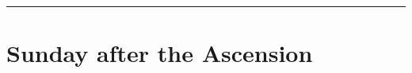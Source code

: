 {{\def\deusinadjutoriumsolemn{T}
\def\postpsalmtitlethree{\needspace{18\baselineskip}}
\def\prepsalmthreeverses{}
\def\preantfive{\needspace{12\baselineskip}}
\def\prevr{\needspace{12\baselineskip}}
\def\premagnificat{\oldneedspace{7\baselineskip}}
\def\premagverses{\greseteolcustos{manual}\oldneedspace{18\baselineskip}}
\def\begincollectcols{%
\begin{parcolumns}[rulebetween,colwidths={1=0.46\linewidth}]{2}}
\def\definevesperspropers{
    \def\prepsalmfive{\greseteolcustos{manual}}
}
\def\definevesperspropersalt{
}
\def\vesperspropersnote{At II Vespers:}
\def\vesperspropersaltnote{At I Vespers:}
\let\printhymnnote=\undefined
\def\hymnlabel{hymn-salutishumanaesator}
\def\prevr{\bigskip{}
\emph{On the Sunday after the Ascension, \emph{\Vbar{}~Dóminus in cælo}, p.~\pageref{vr-sundayafterascension}}.

\bigskip}

\def\commemorations{If today is April 30 or May 1, \emph{First Vespers of St Joseph the Worker} is commemorated as on page \pageref{stjoseph-worker-commem}.}
\printcommemnote[1]{}
\bigskip
\hrule
}

{
\section{Sunday after the Ascension}
\label{easter6}\label{sundayafterascension}
\printcommonvespers{}
\renewcommand{\printhymnnote}{
    \medskip
    \noindent\printnote{Hymn.~\emph{Salútis humánæ Sator}, page \pageref{hymn-salutishumanaesator}.}
    \medskip
    \def\vrlinebreak{T}
    \label{vr-sundayafterascension}
    \printvr[\greseteolcustos{manual}]{\vrtex}{\vtranslation}{\rtranslation}
}
\def\precollect{\printvrdominusincaelo}
\def\premagtitle{\bigskip\bigskip}
\benedicamusdomino{}
}
}